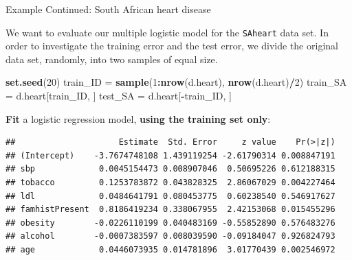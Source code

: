 \documentclass[10pt,ignorenonframetext,]{beamer}
\newenvironment{Shaded}{\begin{snugshade}}{\end{snugshade}}
\newcommand{\KeywordTok}[1]{\textcolor[rgb]{0.13,0.29,0.53}{\textbf{#1}}}
\newcommand{\DataTypeTok}[1]{\textcolor[rgb]{0.13,0.29,0.53}{#1}}
\newcommand{\DecValTok}[1]{\textcolor[rgb]{0.00,0.00,0.81}{#1}}
\newcommand{\StringTok}[1]{\textcolor[rgb]{0.31,0.60,0.02}{#1}}
\newcommand{\OperatorTok}[1]{\textcolor[rgb]{0.81,0.36,0.00}{\textbf{#1}}}
\newcommand{\NormalTok}[1]{#1}
\begin{document}
\begin{frame}[fragile]

\begin{block}{Example Continued: South African heart disease}

\vspace{2mm}

We want to evaluate our multiple logistic model for the \texttt{SAheart}
data set. In order to investigate the training error and the test error,
we divide the original data set, randomly, into two samples of equal
size.

\scriptsize

\begin{Shaded}
\begin{Highlighting}[]
\KeywordTok{set.seed}\NormalTok{(}\DecValTok{20}\NormalTok{)}
\NormalTok{train_ID =}\StringTok{ }\KeywordTok{sample}\NormalTok{(}\DecValTok{1}\OperatorTok{:}\KeywordTok{nrow}\NormalTok{(d.heart), }\KeywordTok{nrow}\NormalTok{(d.heart)}\OperatorTok{/}\DecValTok{2}\NormalTok{)}
\NormalTok{train_SA =}\StringTok{ }\NormalTok{d.heart[train_ID, ]}
\NormalTok{test_SA =}\StringTok{ }\NormalTok{d.heart[}\OperatorTok{-}\NormalTok{train_ID, ]}
\end{Highlighting}
\end{Shaded}

\normalsize

\textbf{Fit} a logistic regression model, \textbf{using the training set
only}:

\scriptsize

\begin{Shaded}
\end{Shaded}

\begin{verbatim}
##                     Estimate  Std. Error     z value    Pr(>|z|)
## (Intercept)    -3.7674748108 1.439119254 -2.61790314 0.008847191
## sbp             0.0045154473 0.008907046  0.50695226 0.612188315
## tobacco         0.1253783872 0.043828325  2.86067029 0.004227464
## ldl             0.0484641791 0.080453775  0.60238540 0.546917627
## famhistPresent  0.8186419234 0.338067955  2.42153068 0.015455296
## obesity        -0.0226110199 0.040483169 -0.55852890 0.576483276
## alcohol        -0.0007383597 0.008039590 -0.09184047 0.926824793
## age             0.0446073935 0.014781896  3.01770439 0.002546972
\end{verbatim}

\end{block}

\end{frame}
\end{document}
